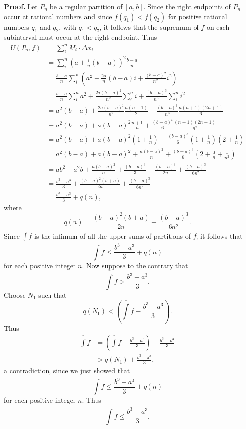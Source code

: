 \documentclass[9pt]{article}
\newcommand{\D}{\displaystyle}
\begin{document}
\begin{enumerate}
      \textbf{Proof.} Let $P_n$ be a regular partition of $[a, b]$. Since the
      right endpoints of $P_n$ occur at rational numbers and since
      $f(q_1) < f(q_2)$ for positive rational numbers $q_1$ and $q_2$, with
      $q_1 < q_2$, it follows that the supremum of $f$ on each subinterval must
      occur at the right endpoint. Thus
      \begin{align*}
         U(P_n, f) &= \sum_i^nM_i \cdot \Delta x_i \\
            &= \sum_i^n\left(a + \frac{i}{n}(b-a)\right)^2 \frac{b-a}{n} \\
            &= \frac{b-a}{n}\sum_i^n\left(a^2+\frac{2a}{n}(b-a)i+
                  \frac{(b-a)^2}{n^2}i^2\right) \\
            &= \frac{b-a}{n}\sum_i^na^2 + \frac{2a(b-a)^2}{n^2}\sum_i^ni +
                  \frac{(b-a)^3}{n^3}\sum_i^ni^2 \\
            &= a^2(b-a) + \frac{2a(b-a)^2}{n^2}\frac{n(n+1)}{2}+
                  \frac{(b-a)^3}{n^3}\frac{n(n+1)(2n+1)}{6} \\
            &= a^2(b-a) + a(b-a)^2\frac{n+1}{n}+
                  \frac{(b-a)^3}{6}\frac{(n+1)(2n+1)}{n^2} \\
            &= a^2(b-a) + a(b-a)^2\left(1 + \frac{1}{n}\right)+
                  \frac{(b-a)^3}{6}\left(1+\frac{1}{n}\right)
                  \left(2+\frac{1}{n}\right) \\
            &= a^2(b-a) + a(b-a)^2 + \frac{a(b-a)^2}{n}+
                  \frac{(b-a)^3}{6}\left(2+\frac{3}{n}+\frac{1}{n^2}\right) \\
            &= ab^2-a^2b + \frac{a(b-a)^2}{n}+\frac{(b-a)^3}{3}+
                  \frac{(b-a)^3}{2n}+\frac{(b-a)^3}{6n^2} \\
            &= \frac{b^3-a^3}{3} +\frac{(b-a)^2(b+a)}{2n}+\frac{(b-a)^3}{6n^2}\\            
            &= \frac{b^3-a^3}{3} +q(n),
      \end{align*}
      where
      $$q(n) = \frac{(b-a)^2(b+a)}{2n}+\frac{(b-a)^3}{6n^2}.$$
      Since $\D\overline{\int} f$ is the infimum of all the upper sums of
      partitions of $f$, it follows that
      $$\overline{\int} f \le \frac{b^3-a^3}{3}+q(n)$$
      for each positive integer $n$. Now suppose to the contrary that
      $$\overline{\int} f > \frac{b^3-a^3}{3}.$$
      Choose $N_1$ such that
      $$q(N_1) < \left(\overline{\int}f - \frac{b^3-a^3}{3}\right).$$
      Thus
      \begin{align*}
         \overline{\int}f &= \left(\overline{\int}f - \frac{b^3-a^3}{3}\right) + \frac{b^3-a^3}{3} \\
           &> q(N_1) + \frac{b^3-a^3}{3},
      \end{align*}
      a contradiction, since we just showed that 
      $$\overline{\int} f \le \frac{b^3-a^3}{3}+q(n)$$
      for each positive integer $n$. Thus
      $$\overline{\int} f \le \frac{b^3-a^3}{3}.$$
      

\end{enumerate}
\end{document}
